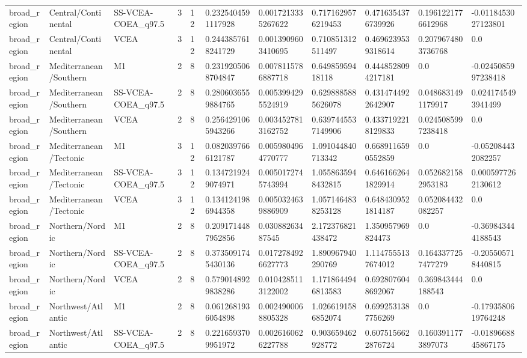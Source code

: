 \begin{landscape}
\begin{longtable}{lllllllllll}
broad\_region & Central/Continental & SS-VCEA-COEA\_q97.5 & 3 & 12 & 0.2325404591117928 & 0.0017213335267622 & 0.7171629576219453 & 0.4716354376739926 & 0.1961221776612968 & -0.0118453027123801 \\
broad\_region & Central/Continental & VCEA & 3 & 12 & 0.2443857618241729 & 0.0013909603410695 & 0.710851312511497 & 0.4696239539318614 & 0.2079674803736768 & 0.0 \\
broad\_region & Mediterranean/Southern & M1 & 2 & 8 & 0.2319205068704847 & 0.0078115786887718 & 0.64985959418118 & 0.4448528094217181 & 0.0 & -0.0245085997238418 \\
broad\_region & Mediterranean/Southern & SS-VCEA-COEA\_q97.5 & 2 & 8 & 0.2806036559884765 & 0.0053994295524919 & 0.6298885885626078 & 0.4314744922642907 & 0.0486831491179917 & 0.0241745493941499 \\
broad\_region & Mediterranean/Southern & VCEA & 2 & 8 & 0.2564291065943266 & 0.0034527813162752 & 0.6397445537149906 & 0.4337192218129833 & 0.0245085997238418 & 0.0 \\
broad\_region & Mediterranean/Tectonic & M1 & 3 & 12 & 0.0820397666121787 & 0.0059804964770777 & 1.091044840713342 & 0.6689116590552859 & 0.0 & -0.052084432082257 \\
broad\_region & Mediterranean/Tectonic & SS-VCEA-COEA\_q97.5 & 3 & 12 & 0.1347219249074971 & 0.0050172745743994 & 1.0558635948432815 & 0.6461662641829914 & 0.0526821582953183 & 0.0005977262130612 \\
broad\_region & Mediterranean/Tectonic & VCEA & 3 & 12 & 0.1341241986944358 & 0.0050324639886909 & 1.0571464838253128 & 0.6484309521814187 & 0.052084432082257 & 0.0 \\
broad\_region & Northern/Nordic & M1 & 2 & 8 & 0.2091714487952856 & 0.03088263487545 & 2.172376821438472 & 1.350957969824473 & 0.0 & -0.369843444188543 \\
broad\_region & Northern/Nordic & SS-VCEA-COEA\_q97.5 & 2 & 8 & 0.3735091745430136 & 0.0172784926627773 & 1.890967940290769 & 1.1147555137674012 & 0.1643377257477279 & -0.205505718440815 \\
broad\_region & Northern/Nordic & VCEA & 2 & 8 & 0.5790148929838286 & 0.0104285113122002 & 1.1718644946813583 & 0.6928076048692067 & 0.369843444188543 & 0.0 \\
broad\_region & Northwest/Atlantic & M1 & 2 & 8 & 0.0612681936054898 & 0.0024900068805328 & 1.0266191586852074 & 0.6992531387756269 & 0.0 & -0.1793580619764248 \\
broad\_region & Northwest/Atlantic & SS-VCEA-COEA\_q97.5 & 2 & 8 & 0.2216593709951972 & 0.0026160626227788 & 0.903659462928772 & 0.6075156622876724 & 0.1603911773897073 & -0.0189668845867175 \\

\end{longtable}
\end{landscape}
